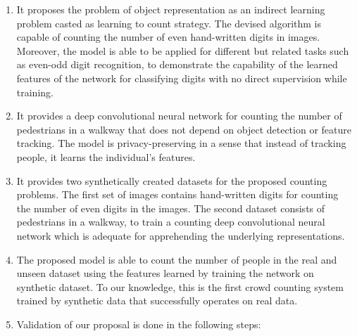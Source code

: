 \begin{enumerate}
	\item It proposes the problem of object representation as an indirect learning problem casted as learning to count strategy. The devised algorithm is capable of counting the number of even hand-written digits in images. Moreover, the model is able to be applied for different but related tasks such as even-odd digit recognition, to demonstrate the capability of the learned features of the network for classifying digits with no direct supervision while training. 
	
	\item It provides a deep convolutional neural network for counting the number of pedestrians in a walkway that does not depend on object detection or feature tracking. The model is privacy-preserving in a sense that instead of tracking people, it learns the individual's features.
	
	\item It provides  two synthetically created datasets for the proposed counting problems. The first set of images contains hand-written digits for counting the number of even digits in the images. The second dataset consists of pedestrians in a walkway, to train a counting deep convolutional neural network which is adequate for apprehending the underlying representations.
	 

	\item The proposed model is able to count the number of people in the real and unseen dataset using the features learned by training the network on synthetic dataset. To our knowledge, this is the first crowd counting system trained by synthetic data that successfully operates on real data. 

	\item Validation of our proposal is done in the following steps:


\end{enumerate}

